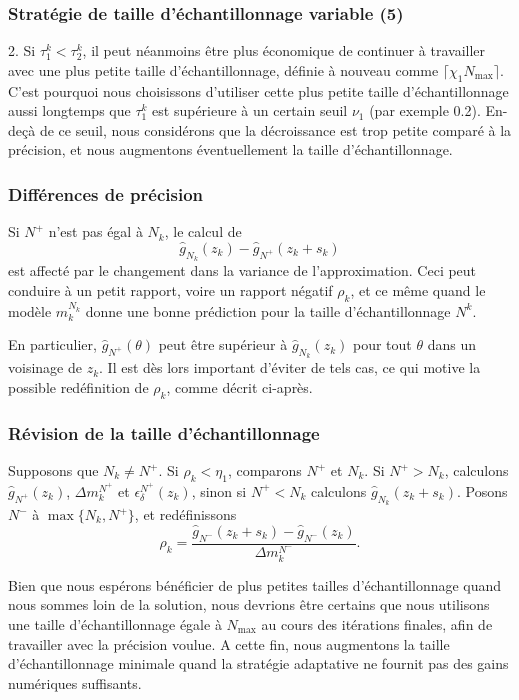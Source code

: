 \documentclass[french]{beamer}
\begin{document}
\begin{frame}
\frametitle{Stratégie de taille d'échantillonnage variable (5)}

2. Si $\tau_1^k < \tau_2^k$, il peut néanmoins être plus économique de
continuer à travailler avec une plus petite taille d'échantillonnage,
définie à nouveau comme $\lceil \chi_1 N_{\max} \rceil$.
C'est pourquoi nous choisissons d'utiliser cette plus petite taille
d'échantillonnage aussi longtemps que $\tau_1^k$ est supérieure à un
certain seuil $\nu_1$ (par exemple 0.2).
En-deçà de ce seuil, nous considérons que la décroissance est trop
petite comparé à la précision, et nous augmentons éventuellement la
taille d'échantillonnage.

\end{frame}

\begin{frame}
\frametitle{Différences de précision}

Si $N^+$ n'est pas égal à $N_k$, le calcul de
\[
 \hat{g}_{N_k} (z_k) - \hat{g}_{N^+} ( z_k + s_k )
\]
est affecté par le changement dans la variance de l'approximation.
Ceci peut conduire à un petit rapport, voire un rapport négatif
$\rho_k$, et ce même quand le modèle $m_k^{N_k}$ donne une bonne
prédiction pour la taille d'échantillonnage $N^k$.

\mbox{}

En particulier, $\hat{g}_{N^+}(\theta)$ peut être supérieur à
$\hat{g}_{N_k}(z_k)$ pour tout $\theta$ dans un voisinage de $z_k$.
Il est dès lors important d'éviter de tels cas, ce qui motive la
possible redéfinition de $\rho_k$, comme décrit ci-après.

\end{frame}

\begin{frame}
\frametitle{Révision de la taille d'échantillonnage}

Supposons que $N_k \ne N^+$.
Si $\rho_k < \eta_1$, comparons $N^+$ et $N_k$.
Si $N^+ > N_k$, calculons $\hat{g}_{N^+}(z_k)$, $\Delta m_k^{N^+}$ et
$\epsilon_{\delta}^{N^+}(z_k)$, sinon si $N^+ < N_k$ calculons
$\hat{g}_{N_k}(z_k + s_k)$.
Posons $N^-$ à $\max\lbrace N_k, N^+ \rbrace$, et redéfinissons
\[
\rho_k = \frac{\hat{g}_{N^-}(z_k+s_k) - \hat{g}_{N^-}(z_k)}{\Delta
m_k^{N^-}}.
\]

\mbox{}

Bien que nous espérons bénéficier de plus petites tailles
d'échantillonnage quand nous sommes loin de la solution, nous devrions
être certains que nous utilisons une taille d'échantillonnage égale à
$N_{\max}$ au cours des itérations finales, afin de travailler avec la
précision voulue.
A cette fin, nous augmentons la taille d'échantillonnage minimale
quand la stratégie adaptative ne fournit pas des gains numériques
suffisants.

\end{frame}
\end{document}
